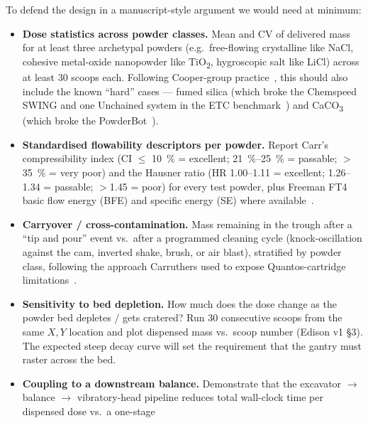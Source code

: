 \documentclass[11pt,a4paper]{article}
\begin{document}
To defend the design in a manuscript-style argument we would need at
minimum:

\begin{itemize}[leftmargin=*]
  \item \textbf{Dose statistics across powder classes.} Mean and CV of
    delivered mass for at least three archetypal powders (e.g.\
    free-flowing crystalline like NaCl, cohesive metal-oxide nanopowder
    like TiO\textsubscript{2}, hygroscopic salt like LiCl) across at least
    30 scoops each. Following Cooper-group
    practice~\cite{jiang2023autonomousbiomimeticsolid}, this should also
    include the known ``hard'' cases --- fumed silica (which broke the
    Chemspeed SWING and one Unchained system in the ETC
    benchmark~\cite{bahr2018collaborativeevaluationof}) and CaCO\textsubscript{3}
    (which broke the PowderBot~\cite{jiang2023autonomousbiomimeticsolid}).
  \item \textbf{Standardised flowability descriptors per powder.} Report
    Carr's compressibility index (CI $\le$ \SI{10}{\percent} = excellent;
    \SIrange{21}{25}{\percent} = passable; $>$\SI{35}{\percent} = very poor)
    and the Hausner ratio (HR \numrange{1.00}{1.11} = excellent;
    \numrange{1.26}{1.34} = passable; $>$\num{1.45} = poor) for every test
    powder, plus Freeman FT4 basic flow energy (BFE) and specific energy
    (SE) where
    available~\cite{moravkar2020traditionalandadvanced,freeman2017characterisingpowderflow,ghoroi2013multifacetedcharacterizationof}.
  \item \textbf{Carryover / cross-contamination.} Mass remaining in the
    trough after a ``tip and pour'' event vs.\ after a programmed cleaning
    cycle (knock-oscillation against the cam, inverted shake, brush, or
    air blast), stratified by powder class, following the approach
    Carruthers used to expose Quantos-cartridge
    limitations~\cite{carruthers2025amobilerobotic}.
  \item \textbf{Sensitivity to bed depletion.} How much does the dose
    change as the powder bed depletes / gets cratered? Run 30 consecutive
    scoops from the same $X,Y$ location and plot dispensed mass vs.\ scoop
    number (Edison v1 \S3). The expected steep decay curve will set the
    requirement that the gantry must raster across the bed.
  \item \textbf{Coupling to a downstream balance.} Demonstrate that the
    excavator $\rightarrow$ balance $\rightarrow$ vibratory-head pipeline
    reduces total wall-clock time per dispensed dose vs.\ a one-stage

\end{itemize}
\end{document}
